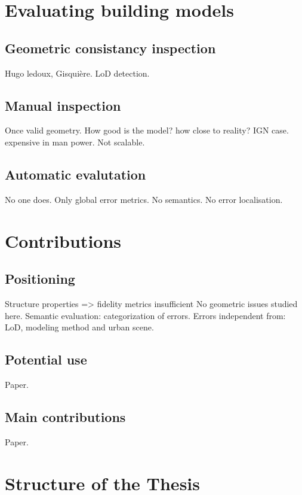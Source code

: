 \section{Evaluating building models}
    \label{sec::introduction::building_model_evaluation}
    \subsection{Geometric consistancy inspection}
        Hugo ledoux, Gisquière. LoD detection.
    \subsection{Manual inspection}
        Once valid geometry. How good is the model? how close to reality?
        IGN case.
        expensive in man power. Not scalable.
    \subsection{Automatic evalutation}
        No one does. Only global error metrics. No semantics. No error localisation.
\section{Contributions}
    \label{sec::introduction::contributions}
    \subsection{Positioning}
        Structure properties => fidelity metrics insufficient
        No geometric issues studied here.
        Semantic evaluation: categorization of errors.
        Errors independent from: LoD, modeling method and urban scene.
    \subsection{Potential use}
        Paper.
    \subsection{Main contributions}
        Paper.
\section{Structure of the Thesis}
    \label{sec::introduction::structure_of_thesis}
